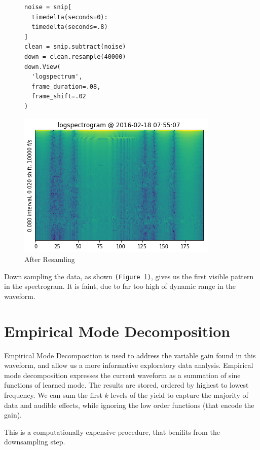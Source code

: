 \documentclass{article}
\begin{document}
\begin{multicols}{2}
\begin{figure}[H]
  \centering
  \begin{lstlisting}
noise = snip[
  timedelta(seconds=0):
  timedelta(seconds=.8)
]
clean = snip.subtract(noise)
down = clean.resample(40000)
down.View(
  'logspectrum',
  frame_duration=.08,
  frame_shift=.02
)
\end{lstlisting}
\includegraphics[width=\columnwidth]{./downspec.png}
  \caption{After Resamling}
  \label{fig:resample}

\end{figure}

Down sampling the data, as shown \texttt{(Figure~\ref{fig:resample})}, gives us the first visible pattern in the spectrogram. It is faint, due to far too high of dynamic range in the waveform.


\section{Empirical Mode Decomposition}

Empirical Mode Decomposition is used to address the variable gain found in this waveform, and allow us a more informative exploratory data analysis. Empirical mode decomposition expresses the current waveform as a summation of sine functions of learned mode. The results are stored, ordered by highest to lowest frequency. We can sum the first $k$ levels of the yield to capture the majority of data and audible effects, while ignoring the low order functions (that encode the gain).

This is a computationally expensive procedure, that benifits from the downsampling step.


\end{multicols}
\end{document}
